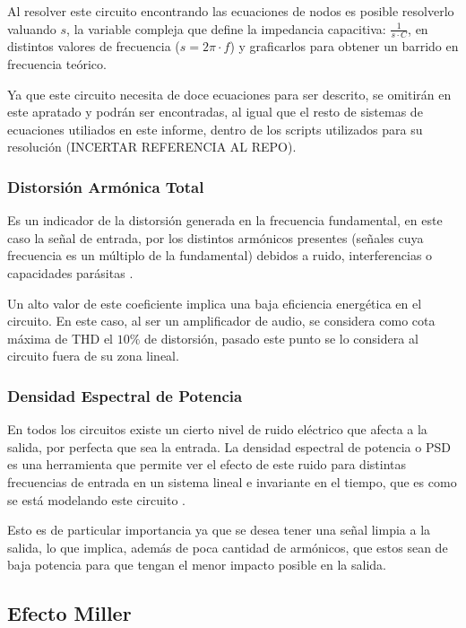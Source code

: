 Al resolver este circuito encontrando las ecuaciones de nodos es posible resolverlo valuando $s$, la variable compleja que define la impedancia capacitiva: $\frac{1}{s\cdot C} $, en distintos valores de frecuencia ($s=2\pi \cdot f $) y graficarlos para obtener un barrido en frecuencia teórico.

Ya que este circuito necesita de doce ecuaciones para ser descrito, se omitirán en este apratado y podrán ser encontradas, al igual que el resto de sistemas de ecuaciones utiliados en este informe, dentro de los scripts utilizados para su resolución (INCERTAR REFERENCIA AL REPO).

\subsubsection{Distorsión Armónica Total}

Es un indicador de la distorsión generada en la frecuencia fundamental, en este caso la señal de entrada, por los distintos armónicos presentes (señales cuya frecuencia es un múltiplo de la fundamental) debidos a ruido, interferencias o capacidades parásitas \cite{vectorenergy_thd}.

Un alto valor de este coeficiente implica una baja eficiencia energética en el circuito. En este caso, al ser un amplificador de audio, se considera como cota máxima de THD el $10\%$ de distorsión, pasado este punto se lo considera al circuito fuera de su zona lineal.

\subsubsection{Densidad Espectral de Potencia}

En todos los circuitos existe un cierto nivel de ruido eléctrico que afecta a la salida, por perfecta que sea la entrada. La densidad espectral de potencia o PSD es una herramienta que permite ver el efecto de este ruido para distintas frecuencias de entrada en un sistema lineal e invariante en el tiempo, que es como se está modelando este circuito \cite{allaboutcircuits_psd}.

Esto es de particular importancia ya que se desea tener una señal limpia a la salida, lo que implica, además de poca cantidad de armónicos, que estos sean de baja potencia para que tengan el menor impacto posible en la salida.

\subsection{Efecto Miller}

